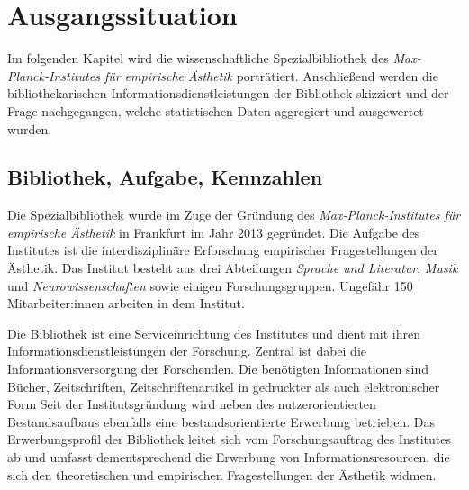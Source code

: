 \chapter{Ausgangssituation}

Im folgenden Kapitel wird die wissenschaftliche Spezialbibliothek des \textit{Max-Planck-Institutes für empirische Ästhetik} porträtiert. 
Anschließend werden die bibliothekarischen Informationsdienstleistungen der
Bibliothek skizziert und der Frage nachgegangen, welche statistischen Daten aggregiert und ausgewertet wurden. 

\section{Bibliothek, Aufgabe, Kennzahlen}


Die Spezialbibliothek wurde im Zuge der Gründung des \textit{Max-Planck-Institutes für empirische Ästhetik} in Frankfurt im Jahr 2013 gegründet.
Die Aufgabe des Institutes ist die interdisziplinäre Erforschung empirischer Fragestellungen der Ästhetik. Das Institut besteht aus drei Abteilungen 
\textit{Sprache und Literatur}, \textit{Musik} und \textit{Neurowissenschaften} sowie einigen Forschungsgruppen. Ungefähr 150 Mitarbeiter:innen arbeiten 
in dem Institut. 

Die Bibliothek ist eine Serviceinrichtung des Institutes und dient mit ihren Informationsdienstleistungen der Forschung.
Zentral ist dabei die Informationsversorgung der Forschenden.
Die benötigten Informationen sind Bücher, Zeitschriften, Zeitschriftenartikel in gedruckter als auch elektronischer Form
Seit der Institutsgründung wird neben des nutzerorientierten Bestandsaufbaus ebenfalls eine bestandsorientierte Erwerbung betrieben.
Das Erwerbungsprofil der Bibliothek leitet sich vom Forschungsauftrag des Institutes ab und umfasst dementsprechend die Erwerbung von Informationsresourcen, die sich den theoretischen und empirischen Fragestellungen der Ästhetik widmen.

